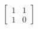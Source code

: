 \documentclass[preview]{standalone}
\begin{document}
\begin{align*}
\begin{bmatrix} 1 & 1 \\ 1 & 0 \end{bmatrix}
\end{align*}
\end{document}
